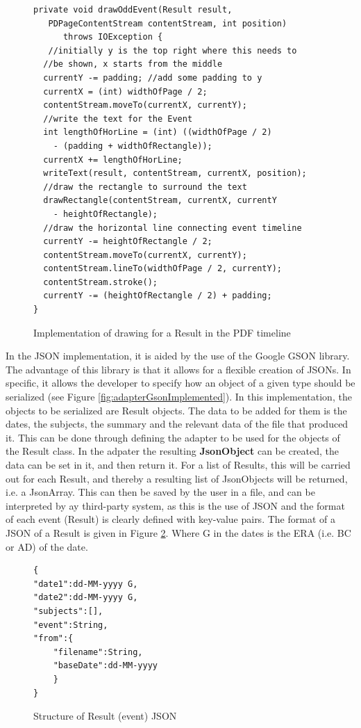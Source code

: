 \begin{figure}[H]
\begin{lstlisting}
private void drawOddEvent(Result result, 
   PDPageContentStream contentStream, int position)
      throws IOException {
   //initially y is the top right where this needs to 
  //be shown, x starts from the middle
  currentY -= padding; //add some padding to y
  currentX = (int) widthOfPage / 2;
  contentStream.moveTo(currentX, currentY);
  //write the text for the Event
  int lengthOfHorLine = (int) ((widthOfPage / 2)
	- (padding + widthOfRectangle));
  currentX += lengthOfHorLine;
  writeText(result, contentStream, currentX, position);
  //draw the rectangle to surround the text
  drawRectangle(contentStream, currentX, currentY 
  	- heightOfRectangle);
  //draw the horizontal line connecting event timeline
  currentY -= heightOfRectangle / 2;
  contentStream.moveTo(currentX, currentY);
  contentStream.lineTo(widthOfPage / 2, currentY);
  contentStream.stroke();
  currentY -= (heightOfRectangle / 2) + padding;
}
\end{lstlisting}
\caption{Implementation of drawing for a Result in the PDF timeline}
\label{fig:drawRecImplemented}
\end{figure}
\par In the JSON implementation, it is aided by the use of the Google GSON library. The advantage of this library is that it allows for a flexible creation of JSONs. In specific, it allows the developer to specify how an object of a given type should  be serialized (see Figure \ref{fig:adapterGsonImplemented}). In this implementation, the objects to be serialized are Result objects. The data to be added for them is the dates, the subjects, the summary and the relevant data of the file that produced it. This can be done through defining the adapter to be used for the objects of the Result class. In the adpater the resulting \textbf{JsonObject} can be created, the data can be set in it, and then return it. For a list of Results, this will be carried out for each Result, and thereby a resulting list of JsonObjects will be returned, i.e. a JsonArray. This can then be saved by the user in a file, and can be interpreted by ay third-party system, as this is the use of JSON and the format of each event (Result) is clearly defined with key-value pairs. The format of a JSON of a Result is given in Figure \ref{fig:jsonResult}. Where G in the dates is the ERA (i.e. BC or AD) of the date.
\begin{figure}[h]
\begin{lstlisting}
{
"date1":dd-MM-yyyy G,
"date2":dd-MM-yyyy G,
"subjects":[],
"event":String,
"from":{
	"filename":String,
	"baseDate":dd-MM-yyyy
	}
}
\end{lstlisting}
\caption{Structure of Result (event) JSON}
\label{fig:jsonResult}
\end{figure}

